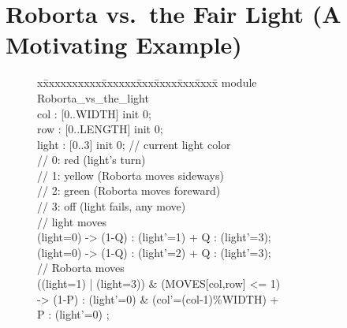 \newcommand{\roborta}{Roborta\xspace}

\section{\roborta vs.\ the Fair Light (A Motivating Example)} \label{sec:mot_example}

\begin{figure}
\vspace{-11.6mm}
{\fontsize{6.6}{6.6}\selectfont\ttfamily
\begin{tabbing}
x\=xxxxxxxxxx\=xxxxxx\=xxx\=xxxx\=xxx\=xxxx\= \kill    
module \roborta\_vs\_the\_light\\[1ex]
\>col : [0..WIDTH] init 0; \\
\>row : [0..LENGTH] init 0; \\
\>light : [0..3] init 0; \>\>\>\> // current light color \\%
\>                   \>\>\>\>// 0: red (light's turn) \\%
\>                   \>\>\>\>// 1: yellow (\roborta moves sideways) \\%
\>                   \>\>\>\>// 2: green (\roborta moves foreward) \\%
\>                   \>\>\>\>// 3: off (light fails, any move) \\[1ex]
\> // light moves \\[1ex]
\>[l\_y] (light=0) \> \>-> \>(1-Q) : (light'=1) + Q : (light'=3);\\[1ex]
\>[l\_g] (light=0) \> \>-> \>(1-Q) : (light'=2) + Q : (light'=3);\\[1ex]
\> // \roborta moves \\[1ex]
\>[r\_l]  ((light=1) | (light=3)) \& (MOVES[col,row] <= 1)  \\
\>                    \>\>-> \>(1-P) : (light'=0) \& (col'=(col-1)\%WIDTH) + \\       
\>                     \>\>\>  P : (light'=0) ; \\[1ex]


\end{tabbing}}
\end{figure}
